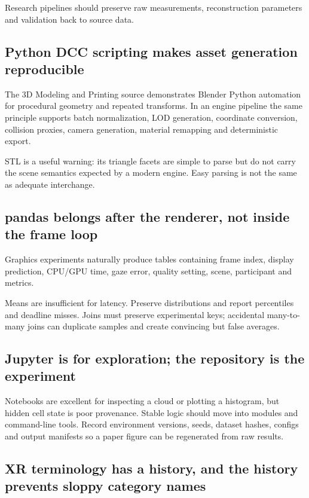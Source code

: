 Research pipelines should preserve raw measurements, reconstruction parameters and validation back to source data.

\subsection{Python DCC scripting makes asset generation reproducible}\label{python-dcc-scripting-makes-asset-generation-reproducible}

The 3D Modeling and Printing source demonstrates Blender Python automation for procedural geometry and repeated transforms. In an engine pipeline the same principle supports batch normalization, LOD generation, coordinate conversion, collision proxies, camera generation, material remapping and deterministic export.

STL is a useful warning: its triangle facets are simple to parse but do not carry the scene semantics expected by a modern engine. Easy parsing is not the same as adequate interchange.

\subsection{pandas belongs after the renderer, not inside the frame loop}\label{pandas-belongs-after-the-renderer-not-inside-the-frame-loop}

Graphics experiments naturally produce tables containing frame index, display prediction, CPU/GPU time, gaze error, quality setting, scene, participant and metrics.

Means are insufficient for latency. Preserve distributions and report percentiles and deadline misses. Joins must preserve experimental keys; accidental many-to-many joins can duplicate samples and create convincing but false averages.

\subsection{Jupyter is for exploration; the repository is the experiment}\label{jupyter-is-for-exploration-the-repository-is-the-experiment}

Notebooks are excellent for inspecting a cloud or plotting a histogram, but hidden cell state is poor provenance. Stable logic should move into modules and command-line tools. Record environment versions, seeds, dataset hashes, configs and output manifests so a paper figure can be regenerated from raw results.

\subsection{XR terminology has a history, and the history prevents sloppy category names}\label{xr-terminology-has-a-history-and-the-history-prevents-sloppy-category-names}

